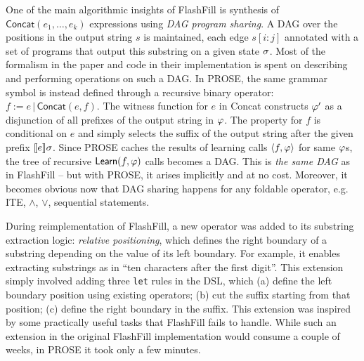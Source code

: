 \begin{scenario}
    One of the main algorithmic insights of FlashFill is synthesis of $\mathsf{Concat}(e_1, \dots, e_k)$ expressions
    using \emph{DAG program sharing}.
    A DAG over the positions in the output string $s$ is maintained, each edge $s[i:j]$ annotated with a
    set of programs that output this substring on a given state $\sigma$.
    Most of the formalism in the paper and code in their implementation is spent on describing and performing operations
    on such a DAG.
    In PROSE, the same grammar symbol is instead defined through a recursive binary operator: $f := e \,|\,
    \mathsf{Concat}(e, f)$.
    The witness function for $e$ in \textsf{Concat} constructs $\varphi'$ as a disjunction of all prefixes of
    the output string in $\varphi$.
    The property for $f$ is conditional on $e$ and simply selects the suffix of the output string after the given prefix
    $\llbracket e \rrbracket{\ensuremath{\sigma}}$.
    Since PROSE caches the results of learning calls $\langle f, \varphi \rangle$ for same $\varphi$s, the tree of
    recursive $\mathsf{Learn}(f, \varphi)$ calls becomes a DAG.
    This is \emph{the same DAG} as in FlashFill -- but with PROSE, it arises implicitly and at no cost.
    Moreover, it becomes obvious now that DAG sharing happens for any foldable operator, e.g. \textsf{ITE}, $\wedge$,
    $\vee$, sequential statements.
\end{scenario}

\begin{scenario}
    During reimplementation of FlashFill, a new operator was added to its substring extraction logic: \emph{relative
    positioning},
    which defines the right boundary of a substring depending on the value of its left boundary.
    For example, it enables extracting substrings as in ``ten characters after the first digit''.
    This extension simply involved adding three \texttt{let} rules in the DSL, which (a) define the left boundary
    position using existing operators; (b) cut the suffix starting from that position; (c) define the right boundary in
    the suffix.
    This extension was inspired by some practically useful tasks that FlashFill fails to handle.
    While such an extension in the original FlashFill implementation would consume a couple of weeks, in PROSE it
    took only a few minutes.
\end{scenario}

